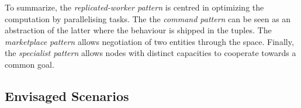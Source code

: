 To summarize, the \emph{replicated-worker pattern} is centred in optimizing the computation by parallelising tasks.
The the \emph{command pattern} can be seen as an abstraction of the latter where the behaviour is shipped in the tuples.
The \emph{marketplace pattern} allows negotiation of two entities through the space.
Finally, the \emph{specialist pattern} allows nodes with distinct capacities to cooperate towards a common goal.




\subsection{Envisaged Scenarios} %
\label{sec:envisaged_scenarios}

